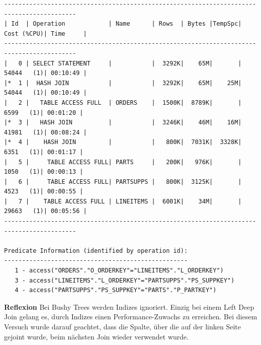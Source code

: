 \documentclass[10pt]{article}
\begin{document}
\begin{lstlisting}[style=queryexecutionplan]
------------------------------------------------------------------------------------------
| Id  | Operation            | Name      | Rows  | Bytes |TempSpc| Cost (%CPU)| Time     |
------------------------------------------------------------------------------------------
|   0 | SELECT STATEMENT     |           |  3292K|    65M|       | 54044   (1)| 00:10:49 |
|*  1 |  HASH JOIN           |           |  3292K|    65M|    25M| 54044   (1)| 00:10:49 |
|   2 |   TABLE ACCESS FULL  | ORDERS    |  1500K|  8789K|       |  6599   (1)| 00:01:20 |
|*  3 |   HASH JOIN          |           |  3246K|    46M|    16M| 41981   (1)| 00:08:24 |
|*  4 |    HASH JOIN         |           |   800K|  7031K|  3328K|  6351   (1)| 00:01:17 |
|   5 |     TABLE ACCESS FULL| PARTS     |   200K|   976K|       |  1050   (1)| 00:00:13 |
|   6 |     TABLE ACCESS FULL| PARTSUPPS |   800K|  3125K|       |  4523   (1)| 00:00:55 |
|   7 |    TABLE ACCESS FULL | LINEITEMS |  6001K|    34M|       | 29663   (1)| 00:05:56 |
------------------------------------------------------------------------------------------
 
Predicate Information (identified by operation id):
---------------------------------------------------
   1 - access("ORDERS"."O_ORDERKEY"="LINEITEMS"."L_ORDERKEY")
   3 - access("LINEITEMS"."L_ORDERKEY"="PARTSUPPS"."PS_SUPPKEY")
   4 - access("PARTSUPPS"."PS_SUPPKEY"="PARTS"."P_PARTKEY")
\end{lstlisting}
\textbf{Reflexion} \newline
Bei Bushy Trees werden Indizes ignoriert. Einzig bei einem Left Deep Join gelang es, durch Indizes einen Performance-Zuwachs zu erreichen.
Bei diesem Versuch wurde darauf geachtet, dass die Spalte, über die auf der linken Seite gejoint wurde, beim nächsten Join wieder verwendet wurde.
\end{document}
